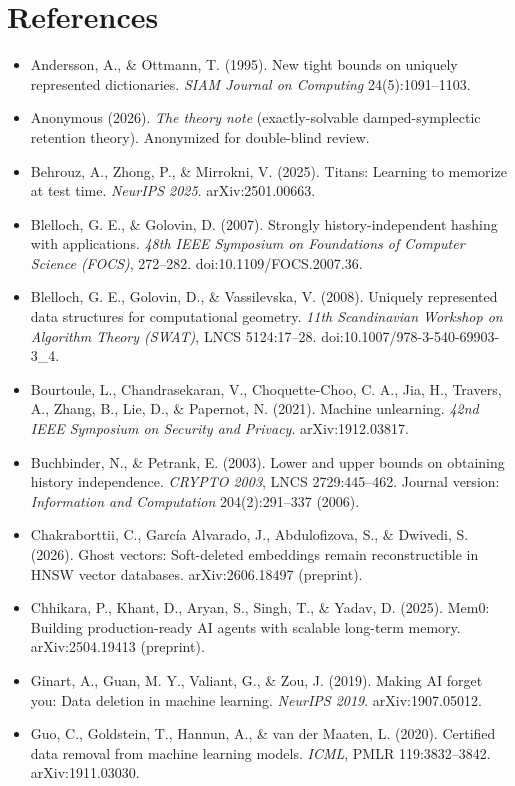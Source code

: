 \documentclass{article}
\begin{document}
\section*{References}
{\begin{itemize}
\item Andersson, A., \& Ottmann, T. (1995). New tight bounds on uniquely represented dictionaries. \emph{SIAM Journal on Computing} 24(5):1091--1103.
\item Anonymous (2026). \emph{The theory note} (exactly-solvable damped-symplectic retention theory). Anonymized for double-blind review.
\item Behrouz, A., Zhong, P., \& Mirrokni, V. (2025). Titans: Learning to memorize at test time. \emph{NeurIPS 2025}. arXiv:2501.00663.
\item Blelloch, G. E., \& Golovin, D. (2007). Strongly history-independent hashing with applications. \emph{48th IEEE Symposium on Foundations of Computer Science (FOCS)}, 272--282. doi:10.1109/FOCS.2007.36.
\item Blelloch, G. E., Golovin, D., \& Vassilevska, V. (2008). Uniquely represented data structures for computational geometry. \emph{11th Scandinavian Workshop on Algorithm Theory (SWAT)}, LNCS 5124:17--28. doi:10.1007/978-3-540-69903-3\_4.
\item Bourtoule, L., Chandrasekaran, V., Choquette-Choo, C. A., Jia, H., Travers, A., Zhang, B., Lie, D., \& Papernot, N. (2021). Machine unlearning. \emph{42nd IEEE Symposium on Security and Privacy}. arXiv:1912.03817.
\item Buchbinder, N., \& Petrank, E. (2003). Lower and upper bounds on obtaining history independence. \emph{CRYPTO 2003}, LNCS 2729:445--462. Journal version: \emph{Information and Computation} 204(2):291--337 (2006).
\item Chakraborttii, C., Garc\'ia Alvarado, J., Abdulofizova, S., \& Dwivedi, S. (2026). Ghost vectors: Soft-deleted embeddings remain reconstructible in HNSW vector databases. arXiv:2606.18497 (preprint).
\item Chhikara, P., Khant, D., Aryan, S., Singh, T., \& Yadav, D. (2025). Mem0: Building production-ready AI agents with scalable long-term memory. arXiv:2504.19413 (preprint).
\item Ginart, A., Guan, M. Y., Valiant, G., \& Zou, J. (2019). Making AI forget you: Data deletion in machine learning. \emph{NeurIPS 2019}. arXiv:1907.05012.
\item Guo, C., Goldstein, T., Hannun, A., \& van der Maaten, L. (2020). Certified data removal from machine learning models. \emph{ICML}, PMLR 119:3832--3842. arXiv:1911.03030.

\end{itemize}}
\end{document}
